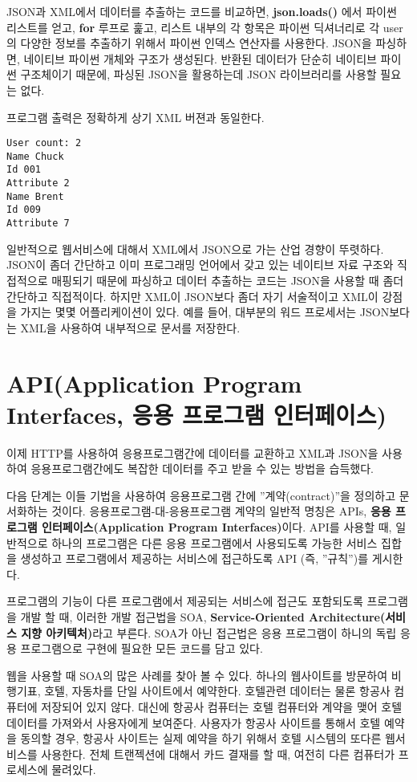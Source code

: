 JSON과 XML에서 데이터를 추출하는 코드를 비교하면, 
{\bf json.loads()} 에서 파이썬 리스트를 얻고,
{\bf for} 루프로 훑고, 리스트 내부의 각 항목은 파이썬 딕셔너리로
각 user의 다양한 정보를 추출하기 위해서 파이썬 인덱스 연산자를 사용한다. 
JSON을 파싱하면, 네이티브 파이썬 개체와 구조가 생성된다.
반환된 데이터가 단순히 네이티브 파이썬 구조체이기 때문에, 파싱된 JSON을 활용하는데
JSON 라이브러리를 사용할 필요는 없다. 
 
프로그램 출력은 정확하게 상기 XML 버젼과 동일한다.

\beforeverb
\begin{verbatim}
User count: 2
Name Chuck
Id 001
Attribute 2
Name Brent
Id 009
Attribute 7
\end{verbatim}
\afterverb
%

일반적으로 웹서비스에 대해서 XML에서 JSON으로 가는 산업 경향이 뚜렷하다.
JSON이 좀더 간단하고 이미 프로그래밍 언어에서 갖고 있는 네이티브 자료 구조와 직접적으로 매핑되기 때문에
파싱하고 데이터 추출하는 코드는 JSON을 사용할 때 좀더 간단하고 직접적이다.
하지만 XML이 JSON보다 좀더 자기 서술적이고 XML이 강점을 가지는 몇몇 어플리케이션이 있다.
예를 들어, 대부분의 워드 프로세서는 JSON보다는 XML을 사용하여 내부적으로 문서를 저장한다. 

\section{API(Application Program Interfaces, 응용 프로그램 인터페이스)}

이제 HTTP를 사용하여 응용프로그램간에 데이터를 교환하고 XML과 JSON을 사용하여 응용프로그램간에도
복잡한 데이터를 주고 받을 수 있는 방법을 습득했다.

다음 단계는 이들 기법을 사용하여 응용프로그램 간에 ''계약(contract)''을 정의하고 문서화하는 것이다.
응용프로그램-대-응용프로그램 계약의 일반적 명칭은 APIs, {\bf 응용 프로그램 인터페이스(Application Program 
Interfaces)}이다. API를 사용할 때, 일반적으로 하나의 프로그램은 다른 응용 프로그램에서 사용되도록
가능한 서비스 집합을 생성하고 프로그램에서 제공하는 서비스에 접근하도록 API (즉, ''규칙'')를 게시한다.  

프로그램의 기능이 다른 프로그램에서 제공되는 서비스에 접근도 포함되도록 프로그램을 개발 할 때,
이러한 개발 접근법을 SOA, {\bf Service-Oriented Architecture(서비스 지향 아키텍처)}라고 부른다.
SOA가 아닌 접근법은 응용 프로그램이 하니의 독립 응용 프로그램으로 구현에 필요한 모든 코드를 담고 있다.

웹을 사용할 때 SOA의 많은 사례를 찾아 볼 수 있다. 하나의 웹사이트를 방문하여 비행기표, 호텔, 자동차를 단일
사이트에서 예약한다. 호텔관련 데이터는 물론 항공사 컴퓨터에 저장되어 있지 않다.
대신에 항공사 컴퓨터는 호텔 컴퓨터와 계약을 맺어 호텔 데이터를 가져와서 사용자에게 보여준다.
사용자가 항공사 사이트를 통해서 호텔 예약을 동의할 경우, 항공사 사이트는 실제 예약을 하기 위해서
호텔 시스템의 또다른 웹서비스를 사용한다.
전체 트랜젝션에 대해서 카드 결재를 할 때, 여전히 다른 컴퓨터가 프로세스에 물려있다.

